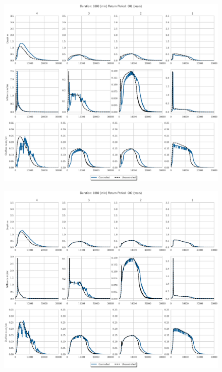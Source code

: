 \begin{figure}
    \centering
    \includegraphics[width=\linewidth]{./RL-SI-figures/77storms/1080001.eps}
\end{figure}
\begin{figure}
    \centering
    \includegraphics[width=\linewidth]{./RL-SI-figures/77storms/1080002.eps}
\end{figure}
